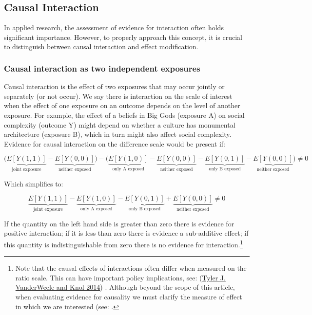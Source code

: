 \documentclass[
  singlecolumn]{report}
\begin{document}
\hypertarget{causal-interaction}{%
\subsection{Causal Interaction}\label{causal-interaction}}

In applied research, the assessment of evidence for interaction often
holds significant importance. However, to properly approach this
concept, it is crucial to distinguish between causal interaction and
effect modification.

\hypertarget{causal-interaction-as-two-independent-exposures}{%
\subsubsection{Causal interaction as two independent
exposures}\label{causal-interaction-as-two-independent-exposures}}

Causal interaction is the effect of two exposures that may occur jointly
or separately (or not occur). We say there is interaction on the scale
of interest when the effect of one exposure on an outcome depends on the
level of another exposure. For example, the effect of a beliefs in Big
Gods (exposure A) on social complexity (outcome Y) might depend on
whether a culture has monumental architecture (exposure B), which in
turn might also affect social complexity. Evidence for causal
interaction on the difference scale would be present if:

\[\bigg(\underbrace{E[Y(1,1)]}_{\text{joint exposure}} - \underbrace{E[Y(0,0)]}_{\text{neither exposed}}\bigg) - \bigg(\underbrace{E[Y(1,0)]}_{\text{only A exposed}} - \underbrace{E[Y(0,0)]}_{\text{neither exposed}}- \underbrace{E[Y(0,1)]}_{\text{only B exposed}} - \underbrace{E[Y(0,0)]}_{\text{neither exposed}} \bigg) \neq 0 \]

Which simplifies to:

\[ \underbrace{E[Y(1,1)]}_{\text{joint exposure}} - \underbrace{E[Y(1,0)]}_{\text{only A exposed}} - \underbrace{E[Y(0,1)]}_{\text{only B exposed}} + \underbrace{E[Y(0,0)]}_{\text{neither exposed}} \neq 0 \]

If the quantity on the left hand side is greater than zero there is
evidence for positive interaction; if it is less than zero there is
evidence a sub-additive effect; if this quantity is indistinguishable
from zero there is no evidence for interaction.\footnote{Note that the
  causal effects of interactions often differ when measured on the ratio
  scale. This can have important policy implications, see:
  (\protect\hyperlink{ref-vanderweele2014}{Tyler J. VanderWeele and Knol
  2014}) . Although beyond the scope of this article, when evaluating
  evidence for causality we must clarify the measure of effect in which
  we are interested (see: .}
\end{document}

